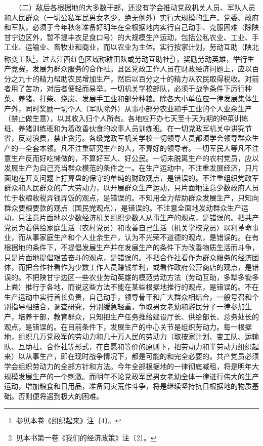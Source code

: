 \documentclass[cn,11pt,chinese]{elegantbook}
\begin{document}
　　（二）敌后各根据地的大多数干部，还没有学会推动党政机关人员、军队人员和人民群众（一切公私军民男女老少，绝无例外）实行大规模的生产。党委、政府和军队，必须于今年秋冬准备好明年在全根据地内实行自己动手、克服困难（除陕甘宁边区外，暂不提丰衣足食口号）的大规模生产运动，包括公私农业、工业、手工业、运输业、畜牧业和商业，而以农业为主体。实行按家计划，劳动互助（陕北称变工队\footnote[1]{ 参见本卷《组织起来》注〔4〕。}，过去江西红色区域称耕田队或劳动互助社\footnote[2]{ 见本书第一卷《我们的经济政策》注〔2〕。}），奖励劳动英雄，举行生产竞赛，发展为群众服务的合作社。县区党政工作人员在财政经济问题上，应以百分之九十的精力帮助农民增加生产，然后以百分之十的精力从农民取得税收。对前者用了苦功，对后者便轻而易举。一切机关学校部队，必须于战争条件下厉行种菜、养猪、打柴、烧炭、发展手工业和部分种粮。除各大小单位应一律发展集体生产外，同时奖励一切个人（军队除外）从事小部分农业和手工业的个人业余生产（禁止做生意），以其收入归个人所有。各地应开办七天至十天为期的种菜训练班、养猪训练班和为着改善伙食的炊事人员训练班。在一切党政军机关中讲究节省，反对浪费，禁止贪污。各级党政军机关学校一切领导人员都须学会领导群众生产的一全套本领。凡不注重研究生产的人，不算好的领导者。一切军民人等凡不注意生产反而好吃懒做的，不算好军人、好公民。一切未脱离生产的农村党员，应以发展生产为自己充当群众模范的条件之一。在生产运动中，不注重发展经济，只片面地在开支问题上打算盘的保守的单纯的财政观点，是错误的。不注重组织党政军群众和人民群众的广大劳动力，以开展群众生产运动，只片面地注意少数政府人员忙于收粮收税弄钱弄饭的观点，是错误的。不知用全力帮助群众发展生产，只知向群众要粮要款的观点（国民党观点），是错误的。不注意全面地发动群众生产运动，只注意片面地以少数经济机关组织少数人从事生产的观点，是错误的。把共产党员为着供给家庭生活（农村党员）和改善自己生活（机关学校党员）以利革命事业，而从事家庭生产和个人业余生产，认为不光荣不道德的观点，是错误的。在有根据地的条件下，不提倡发展生产并在发展生产的条件下为改善物质生活而斗争，只是片面地提倡艰苦奋斗的观点，是错误的。不把合作社看作为群众服务的经济团体，而把合作社看作为少数工作人员赚钱牟利，或看作政府公营商店的观点，是错误的。不把陕甘宁边区一些农业劳动英雄的模范劳动方法（劳动互助，多犁多锄多上粪）推行于各地，而说这些方法不能在某些根据地推行的观点，是错误的。不在生产运动中实行首长负责，自己动手，领导骨干和广大群众相结合，一般号召和个别指导相结合，调查研究，分别缓急轻重，争取男女老幼和游民分子一律参加生产，培养干部，教育群众，只知把生产任务推给建设厅长、供给部长、总务处长的观点，是错误的。在目前条件下，发展生产的中心关节是组织劳动力。每一根据地，组织几万党政军的劳动力和几十万人民的劳动力（取按家计划、变工队、运输队、互助社、合作社等形式，在自愿和等价的原则下，把劳动力和半劳动力组织起来）以从事生产，即在现时战争情况下，都是可能的和完全必要的。共产党员必须学会组织劳动力的全部方针和方法。今年全部根据地的一律彻底减租，将是明年大规模发展生产的一个刺激。而明年不论党政军民男女老幼全体一律进行伟大的生产运动，增加粮食和日用品，准备同灾荒作斗争，将是继续坚持抗日根据地的物质基础。否则便将遇到极大的困难。\\
\end{document}
